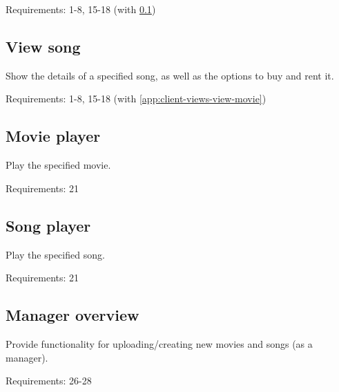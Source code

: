 Requirements: 1-8, 15-18 (with \ref{app:client-views-view-song})

\subsection{View song}
\label{app:client-views-view-song}
Show the details of a specified song, as well as the options to buy and rent it.

Requirements: 1-8, 15-18 (with \ref{app:client-views-view-movie})

\subsection{Movie player}
Play the specified movie.

Requirements:  21

\subsection{Song player}
Play the specified song.

Requirements: 21

\subsection{Manager overview}
Provide functionality for uploading/creating new movies and songs (as a manager).

Requirements: 26-28


